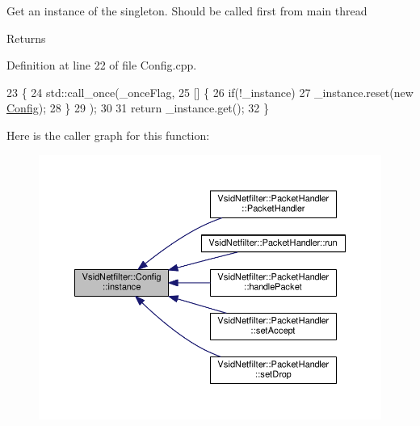 Get an instance of the singleton. Should be called first from main thread \begin{DoxyReturn}{Returns}

\end{DoxyReturn}


Definition at line 22 of file Config.\-cpp.


\begin{DoxyCode}
23 \{
24     std::call\_once(\_onceFlag,
25         [] \{
26     \textcolor{keywordflow}{if}(!\_instance) 
27             \_instance.reset(\textcolor{keyword}{new} \hyperlink{class_vsid_netfilter_1_1_config}{Config});
28         \}
29     );
30 
31     \textcolor{keywordflow}{return} \_instance.get();
32 \}
\end{DoxyCode}


Here is the caller graph for this function\-:
\nopagebreak
\begin{figure}[H]
\begin{center}
\leavevmode
\includegraphics[width=350pt]{class_vsid_netfilter_1_1_config_abf1d4539011ef83cac0fef2ac864a3a9_icgraph}
\end{center}
\end{figure}


